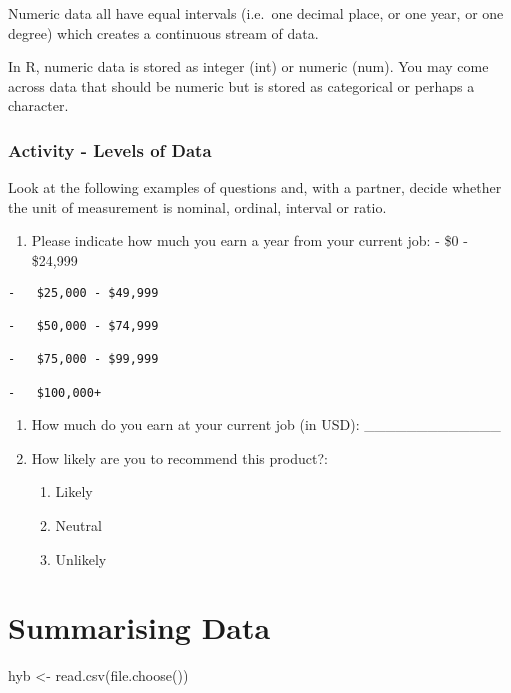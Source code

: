 \documentclass[
  letterpaper,
  DIV=11,
  numbers=noendperiod]{scrreprt}
\newenvironment{Shaded}{\begin{snugshade}}{\end{snugshade}}
\newcommand{\FunctionTok}[1]{\textcolor[rgb]{0.28,0.35,0.67}{#1}}
\newcommand{\NormalTok}[1]{\textcolor[rgb]{0.00,0.23,0.31}{#1}}
\newcommand{\OtherTok}[1]{\textcolor[rgb]{0.00,0.23,0.31}{#1}}
\providecommand{\tightlist}{%
  \setlength{\itemsep}{0pt}\setlength{\parskip}{0pt}}\usepackage{longtable,booktabs,array}
\begin{document}
Numeric data all have equal intervals (i.e.~one decimal place, or one
year, or one degree) which creates a continuous stream of data.

In R, numeric data is stored as integer (int) or numeric (num). You may
come across data that should be numeric but is stored as categorical or
perhaps a character.

\subsection{Activity - Levels of Data}\label{activity---levels-of-data}

Look at the following examples of questions and, with a partner, decide
whether the unit of measurement is nominal, ordinal, interval or ratio.

\begin{enumerate}
\def\labelenumi{\arabic{enumi}.}
\tightlist
\item
  Please indicate how much you earn a year from your current job: - \$0
  - \$24,999
\end{enumerate}

\begin{verbatim}
-   $25,000 - $49,999

-   $50,000 - $74,999

-   $75,000 - $99,999

-   $100,000+
\end{verbatim}

\begin{enumerate}
\def\labelenumi{\arabic{enumi}.}
\setcounter{enumi}{1}
\item
  How much do you earn at your current job (in USD):
  \_\_\_\_\_\_\_\_\_\_\_\_\_
\item
  How likely are you to recommend this product?:

  \begin{enumerate}
  \def\labelenumii{\arabic{enumii}.}
  \tightlist
  \item
    Likely
  \item
    Neutral
  \item
    Unlikely
  \end{enumerate}
\end{enumerate}

\chapter{Summarising Data}\label{summarising-data}

\begin{Shaded}
\begin{Highlighting}[]
\NormalTok{hyb }\OtherTok{\textless{}{-}} \FunctionTok{read.csv}\NormalTok{(}\FunctionTok{file.choose}\NormalTok{())}
\end{Highlighting}
\end{Shaded}
\end{document}

